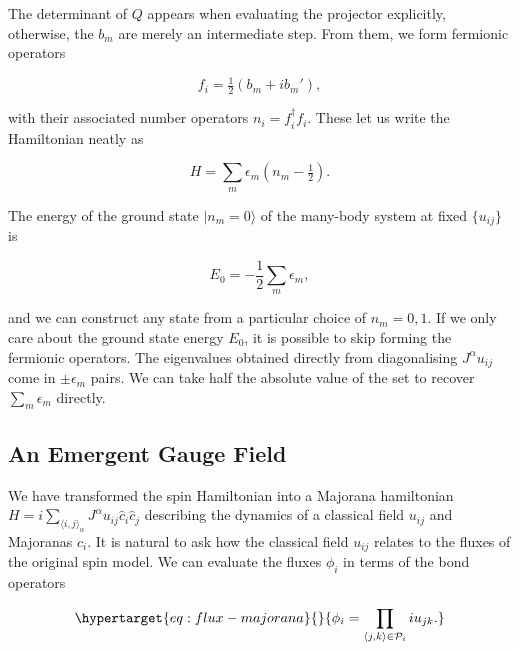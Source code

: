 The determinant of \(Q\) appears when evaluating the projector explicitly, otherwise, the \(b_m\) are merely an intermediate step. From them, we form fermionic operators

\[ f_i = \tfrac{1}{2} (b_m + ib_m'),\]

with their associated number operators \(n_i = f^\dagger_i f_i\). These let us write the Hamiltonian neatly as

\[ H = \sum_m \epsilon_m (n_m - \tfrac{1}{2}).\]

The energy of the ground state \(|n_m = 0\rangle\) of the many-body system at fixed \(\{u_{ij}\}\) is

\[E_{0} = -\frac{1}{2}\sum_m \epsilon_m, \]

and we can construct any state from a particular choice of \(n_m = 0,1\). If we only care about the ground state energy \(E_{0}\), it is possible to skip forming the fermionic operators. The eigenvalues obtained directly from diagonalising \(J^{\alpha} u_{ij}\) come in \(\pm \epsilon_m\) pairs. We can take half the absolute value of the set to recover \(\sum_m \epsilon_m\) directly.

\hypertarget{an-emergent-gauge-field}{%
\subsection{An Emergent Gauge Field}\label{an-emergent-gauge-field}}

We have transformed the spin Hamiltonian into a Majorana hamiltonian \(H = i \sum_{\langle i,j\rangle_\alpha} J^{\alpha} u_{ij} \hat{c}_i \hat{c}_j\) describing the dynamics of a classical field \(u_{ij}\) and Majoranas \(c_i\). It is natural to ask how the classical field \(u_{ij}\) relates to the fluxes of the original spin model. We can evaluate the fluxes \(\phi_i\) in terms of the bond operators

\begin{equation}\protect\hypertarget{eq:flux-majorana}{}{\phi_i = \prod_{\langle j,k\rangle \in \mathcal{P}_i} i u_{jk}.}\label{eq:flux-majorana}\end{equation}

